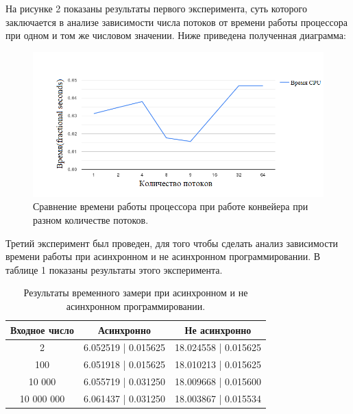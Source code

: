 \documentclass[a4paper, 12pt]{article}
\begin{document}
\begin{flushleft}
	\hspace*{5mm}  На рисунке 2 показаны результаты первого эксперимента, суть которого заключается в анализе зависимости числа потоков от времени работы процессора при одном и том же числовом значении. Ниже приведена полученная диаграмма:
	\clearpage
	\newpage 
	\begin{figure}[h]
		\centering \includegraphics[scale=2]{chart (2)}
		\centering\caption{Сравнение времени работы процессора при работе конвейера при разном количестве потоков.}
	\end{figure}
	\hspace*{5mm} Третий эксперимент был проведен, для того чтобы сделать анализ зависимости времени работы при асинхронном и не асинхронном программировании. В таблице 1 показаны результаты этого эксперимента.
	\newline \\
	\begin{table}[h]
		\centering
		\caption{Результаты временного замери при асинхронном и не асинхронном программировании.\\}
		\begin{tabular}{ | c | c | c | }
			\hline
			Входное число & Асинхронно & Не асинхронно  \\ \hline
			2 & 6.052519 | 0.015625 & 18.024558 | 0.015625 \\ \hline
			100 & 6.051918 | 0.015625 & 18.010213 | 0.015625  \\ \hline
			10 000 & 6.055719 | 0.031250 & 18.009668 | 0.015600 \\ \hline
			10 000 000 & 6.061437 | 0.031250 & 18.003867 | 0.015534  \\ 
			\hline
		\end{tabular}
	\end{table}

	\clearpage
	\newpage

\end{flushleft}
\end{document}
